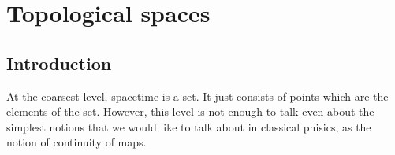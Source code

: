 %


\chapter{Topological spaces}

\section{Introduction}
At the coarsest level, spacetime is a set. It just consists of points which are the elements of the
set. However, this level is not enough to talk even about the simplest notions that we would like to
talk about in classical phisics, as the notion of continuity of maps.

